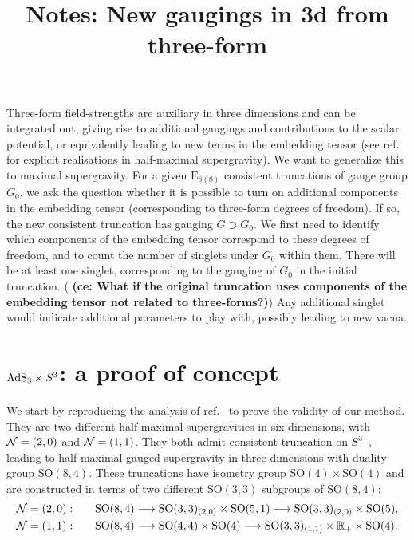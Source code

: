 \documentclass[11pt]{article}
\title{Notes: New gaugings in 3d from three-form}
\author{}
\newcommand{\SO}{\ensuremath{\mathrm{SO}}\xspace}
\newcommand{\E}{\ensuremath{\mathrm{E}}\xspace}
\newcommand{\R}{\ensuremath{\mathbb{R}}\xspace}
\newcommand{\ce}[1]{\marginpar{\parbox{\marginparwidth}{\boldmath $\Longleftarrow$}}
{\boldmath\bfseries (ce: #1)}}
\begin{document}
\maketitle

Three-form field-strengths are auxiliary in three dimensions and can be integrated out, giving rise to additional gaugings and contributions to the scalar potential, or equivalently leading to new terms in the embedding tensor (see ref.~\cite{Deger:2014ofa,Eloy:2021fhc} for explicit realisations in half-maximal supergravity). We want to generalize this to maximal supergravity. For a given $\E_{8(8)}$ consistent truncations of gauge group $G_{0}$, we ask the question whether it is possible to turn on additional components in the embedding tensor (corresponding to three-form degrees of freedom). If so, the new consistent truncation has gauging $G\supset G_{0}$. We first need to identify which components of the embedding tensor correspond to these degrees of freedom, and to count the number of singlets under $G_{0}$ within them. There will be at least one singlet, corresponding to the gauging of $G_{0}$ in the initial truncation. (\ce{What if the original truncation uses components of the embedding tensor not related to three-forms?}) Any additional singlet would indicate additional parameters to play with, possibly leading to new vacua.

\section{\texorpdfstring{${\rm AdS}_{3}\times S^{3}$}{AdS3xS3}: a proof of concept}
We start by reproducing the analysis of ref.~\cite{Eloy:2021fhc} to prove the validity of our method. They are two different half-maximal supergravities in six dimensions, with ${\cal N}=(2,0)$ and ${\cal N}=(1,1)$. They both admit consistent truncation on $S^{3}$~\cite{Hohm:2017wtr,Samtleben:2019zrh}, leading to half-maximal gauged supergravity in three dimensions with duality group $\SO(8,4)$. These truncations have isometry group $\SO(4)\times\SO(4)$ and are constructed in terms of two different $\SO(3,3)$ subgroups of $\SO(8,4)$:
\begin{subequations}
  \begin{align}
    {\cal N}=(2,0):&\qquad \SO(8,4)\longrightarrow\SO(3,3)_{(2,0)}\times \SO(5,1)\longrightarrow\SO(3,3)_{(2,0)}\times \SO(5), \label{eq:SO84decomp20}\\
    {\cal N}=(1,1):&\qquad \SO(8,4)\longrightarrow\SO(4,4)\times \SO(4)\longrightarrow\SO(3,3)_{(1,1)}\times\R_{+}\times\SO(4). \label{eq:SO84decomp11}
  \end{align}
\end{subequations}
\end{document}
